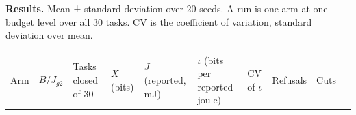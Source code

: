 \documentclass[
  10pt,
]{article}
\newcounter{none} %
\begin{document}
\textbf{Results.} Mean ± standard deviation over 20 seeds. A run is one
arm at one budget level over all 30 tasks. CV is the coefficient of
variation, standard deviation over mean.

{\def\LTcaptype{none} %
\begin{longtable}[]{@{}
  >{\raggedright\arraybackslash}p{}
  >{\raggedright\arraybackslash}p{}
  >{\raggedright\arraybackslash}p{}
  >{\raggedright\arraybackslash}p{}
  >{\raggedright\arraybackslash}p{}
  >{\raggedright\arraybackslash}p{}
  >{\raggedright\arraybackslash}p{}
  >{\raggedright\arraybackslash}p{}
  >{\raggedright\arraybackslash}p{}
  >{\raggedright\arraybackslash}p{}@{}}
\toprule\noalign{}
\begin{minipage}[b]{\linewidth}\raggedright
Arm
\end{minipage} & \begin{minipage}[b]{\linewidth}\raggedright
\(B/J_{g2}\)
\end{minipage} & \begin{minipage}[b]{\linewidth}\raggedright
Tasks closed of 30
\end{minipage} & \begin{minipage}[b]{\linewidth}\raggedright
\(X\) (bits)
\end{minipage} & \begin{minipage}[b]{\linewidth}\raggedright
\(J\) (reported, mJ)
\end{minipage} & \begin{minipage}[b]{\linewidth}\raggedright
\(\iota\) (bits per reported joule)
\end{minipage} & \begin{minipage}[b]{\linewidth}\raggedright
CV of \(\iota\)
\end{minipage} & \begin{minipage}[b]{\linewidth}\raggedright
Refusals
\end{minipage} & \begin{minipage}[b]{\linewidth}\raggedright
Cuts
\end{minipage} & \begin{minipage}[b]{\linewidth}\raggedright

\end{minipage}
\end{longtable}}
\end{document}
